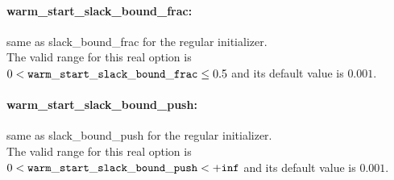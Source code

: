 \paragraph{warm\_start\_slack\_bound\_frac:}\label{sec:warm_start_slack_bound_frac} same as slack\_bound\_frac for the regular initializer. $\;$ \\
 The valid range for this real option is 
$0 <  {\tt warm\_start\_slack\_bound\_frac } \le 0.5$
and its default value is $0.001$.


\paragraph{warm\_start\_slack\_bound\_push:}\label{sec:warm_start_slack_bound_push} same as slack\_bound\_push for the regular initializer. $\;$ \\
 The valid range for this real option is 
$0 <  {\tt warm\_start\_slack\_bound\_push } <  {\tt +inf}$
and its default value is $0.001$.



